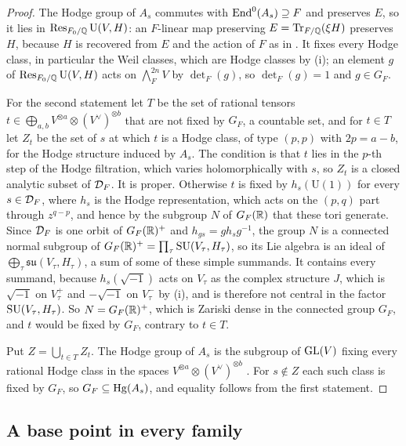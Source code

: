 \begin{proof}
The Hodge group of $A_{s}$ commutes with $\operatorname{End}^{0}(A_{s})\supseteq F$ and
preserves $E$, so it lies in $\operatorname{Res}_{F_{0}/\mathbb{Q}}\mathrm{U}(V,H)$: an $F$-linear
map preserving $E=\operatorname{Tr}_{F/\mathbb{Q}}(\xi H)$ preserves $H$, because $H$ is recovered
from $E$ and the action of $F$ as in . It fixes every Hodge
class, in particular the Weil classes, which are Hodge classes by
(i); an element $g$ of $\operatorname{Res}_{F_{0}/\mathbb{Q}}\mathrm{U}(V,H)$ acts
on $\bigwedge^{2n}_{F}V$ by $\det_{F}(g)$, so $\det_{F}(g)=1$ and
$g\in G_{F}$.

For the second statement let $T$ be the set of rational tensors
$t\in\bigoplus_{a,b}V^{\otimes a}\otimes(V^{\vee})^{\otimes b}$ that are not
fixed by $G_{F}$, a countable set, and for $t\in T$ let $Z_{t}$ be the set of
$s$ at which $t$ is a Hodge class, of type $(p,p)$ with $2p=a-b$, for the
Hodge structure induced by $A_{s}$. The condition is that $t$ lies in the
$p$-th step of the Hodge filtration, which varies holomorphically with $s$, so
$Z_{t}$ is a closed analytic subset of $\mathcal{D}_{F}$. It is proper. Otherwise $t$
is fixed by $h_{s}(\mathrm{U}(1))$ for every $s\in\mathcal{D}_{F}$, where $h_{s}$ is
the Hodge representation, which acts on the $(p,q)$ part through
$z^{q-p}$, and hence by the
subgroup $N$ of $G_{F}(\mathbb{R})$ that these tori generate. Since $\mathcal{D}_{F}$ is one
orbit of $G_{F}(\mathbb{R})^{+}$ and $h_{gs}=gh_{s}g^{-1}$, the group $N$ is a
connected normal subgroup of $G_{F}(\mathbb{R})^{+}=\prod_{\tau}\operatorname{SU}(V_{\tau},H_{\tau})$,
so its Lie algebra is an ideal of
$\bigoplus_{\tau}\mathfrak{su}(V_{\tau},H_{\tau})$, a sum of some of these
simple summands. It contains every summand, because $h_{s}(\sqrt{-1})$ acts on
$V_{\tau}$ as the complex structure $J$, which is $\sqrt{-1}$ on
$V^{+}_{\tau}$ and $-\sqrt{-1}$ on $V^{-}_{\tau}$ by (i),
and is therefore not central in the factor $\operatorname{SU}(V_{\tau},H_{\tau})$. So
$N=G_{F}(\mathbb{R})^{+}$, which is Zariski dense in the connected group $G_{F}$,
and $t$ would be fixed by $G_{F}$, contrary to $t\in T$.

Put $Z=\bigcup_{t\in T}Z_{t}$. The Hodge group of $A_{s}$ is the subgroup of
$\operatorname{GL}(V)$ fixing every rational Hodge class in the spaces
$V^{\otimes a}\otimes(V^{\vee})^{\otimes b}$ \cite[\S3]{Del82}.
For $s\notin Z$ each such class is fixed by $G_{F}$, so
$G_{F}\subseteq\operatorname{Hg}(A_{s})$, and equality follows from the first statement.
\end{proof}

\subsection{A base point in every family}

